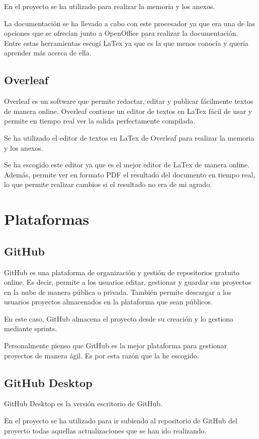 En el proyecto se ha utilizado para realizar la memoria y los anexos.

La documentación se ha llevado a cabo con este procesador ya que era una de las opciones que se ofrecían junto a OpenOffice para realizar la documentación. Entre estas herramientas escogí LaTex ya que es la que menos conocía y quería aprender más acerca de ella.

\subsection{Overleaf}
Overleaf \cite{wiki:overleaf} es un software que permite redactar, editar y publicar fácilmente textos de manera online. Overleaf contiene un editor de textos en LaTex fácil de usar y permite en tiempo real ver la salida perfectamente compilada.

Se ha utilizado el editor de textos en LaTex de Overleaf para realizar la memoria y los anexos.

Se ha escogido este editor ya que es el mejor editor de LaTex de manera online. Además, permite ver en formato PDF el resultado del documento en tiempo real, lo que permite realizar cambios si el resultado no era de mi agrado.

\section{Plataformas}
\subsection{GitHub}
GitHub \cite{wiki:github} es una plataforma de organización y gestión de repositorios gratuito online. Es decir, permite a los usuarios editar, gestionar y guardar sus proyectos en la nube de manera pública o privada. También permite descargar a los usuarios proyectos almacenados en la plataforma que sean públicos.

En este caso, GitHub almacena el proyecto desde su creación y lo gestiona mediante sprints.

Personalmente pienso que GitHub es la mejor plataforma para gestionar proyectos de manera ágil. Es por esta razón que la he escogido.

\subsection{GitHub Desktop}
GitHub Desktop es la versión escritorio de GitHub.

En el proyecto se ha utilizado para ir subiendo al repositorio de GitHub del proyecto todas aquellas actualizaciones que se han ido realizando.

